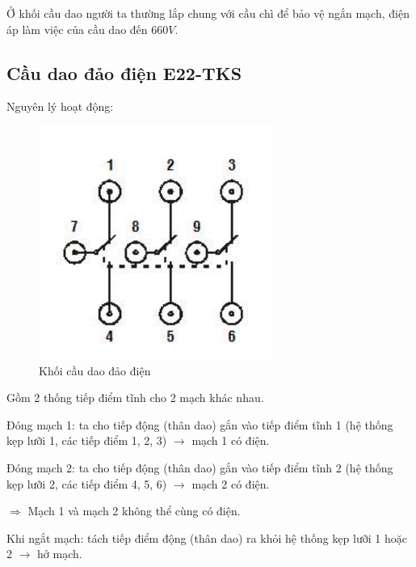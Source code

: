 \documentclass[13pt,a4paper]{extarticle}
\begin{document}
Ở khối cầu dao người ta thường lắp chung với cầu chì để bảo vệ ngắn mạch, điện áp làm việc của cầu dao đến $660V$.
\subsection{Cầu dao đảo điện E22-TKS}
Nguyên lý hoạt động:
\begin{figure}[!h]
\begin{center}
\includegraphics[scale=.7]{cau-dao2-dien}
\end{center}
\caption{Khối cầu dao đảo điện}
\end{figure}
\begin{list}{--}{}
\item Gồm 2 thống tiếp điểm tĩnh cho 2 mạch khác nhau.
\item Đóng mạch 1: ta cho tiếp động (thân dao) gắn vào tiếp điểm tĩnh 1 (hệ thống kẹp lưỡi 1, các tiếp điểm 1, 2, 3) $\longrightarrow$ mạch 1 có điện.
\item Đóng mạch 2: ta cho tiếp động (thân dao) gắn vào tiếp điểm tĩnh 2 (hệ thống kẹp lưỡi 2, các tiếp điểm 4, 5, 6) $\longrightarrow$ mạch 2 có điện.

$\Longrightarrow$ Mạch 1 và mạch 2 không thể cùng có điện.
\item Khi ngắt mạch: tách tiếp điểm động (thân dao) ra khỏi hệ thống kẹp lưỡi 1 hoặc 2 $\longrightarrow$ hở mạch.
\end{list}
\end{document}
